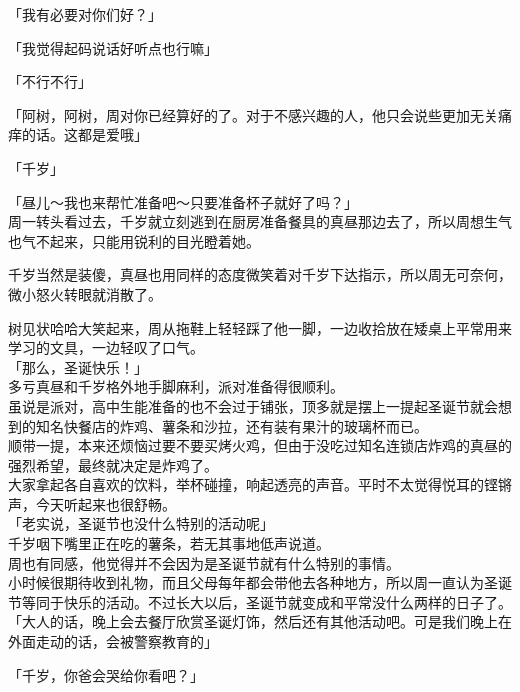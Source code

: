 「我有必要对你们好？」

「我觉得起码说话好听点也行嘛」

「不行不行」

「阿树，阿树，周对你已经算好的了。对于不感兴趣的人，他只会说些更加无关痛痒的话。这都是爱哦」

「千岁」

「昼儿～我也来帮忙准备吧～只要准备杯子就好了吗？」\\

周一转头看过去，千岁就立刻逃到在厨房准备餐具的真昼那边去了，所以周想生气也气不起来，只能用锐利的目光瞪着她。

千岁当然是装傻，真昼也用同样的态度微笑着对千岁下达指示，所以周无可奈何，微小怒火转眼就消散了。

树见状哈哈大笑起来，周从拖鞋上轻轻踩了他一脚，一边收拾放在矮桌上平常用来学习的文具，一边轻叹了口气。\\

「那么，圣诞快乐！」\\

多亏真昼和千岁格外地手脚麻利，派对准备得很顺利。\\

虽说是派对，高中生能准备的也不会过于铺张，顶多就是摆上一提起圣诞节就会想到的知名快餐店的炸鸡、薯条和沙拉，还有装有果汁的玻璃杯而已。\\

顺带一提，本来还烦恼过要不要买烤火鸡，但由于没吃过知名连锁店炸鸡的真昼的强烈希望，最终就决定是炸鸡了。\\

大家拿起各自喜欢的饮料，举杯碰撞，响起透亮的声音。平时不太觉得悦耳的铿锵声，今天听起来也很舒畅。\\

「老实说，圣诞节也没什么特别的活动呢」\\

千岁咽下嘴里正在吃的薯条，若无其事地低声说道。\\

周也有同感，他觉得并不会因为是圣诞节就有什么特别的事情。\\

小时候很期待收到礼物，而且父母每年都会带他去各种地方，所以周一直认为圣诞节等同于快乐的活动。不过长大以后，圣诞节就变成和平常没什么两样的日子了。\\

「大人的话，晚上会去餐厅欣赏圣诞灯饰，然后还有其他活动吧。可是我们晚上在外面走动的话，会被警察教育的」

「千岁，你爸会哭给你看吧？」

